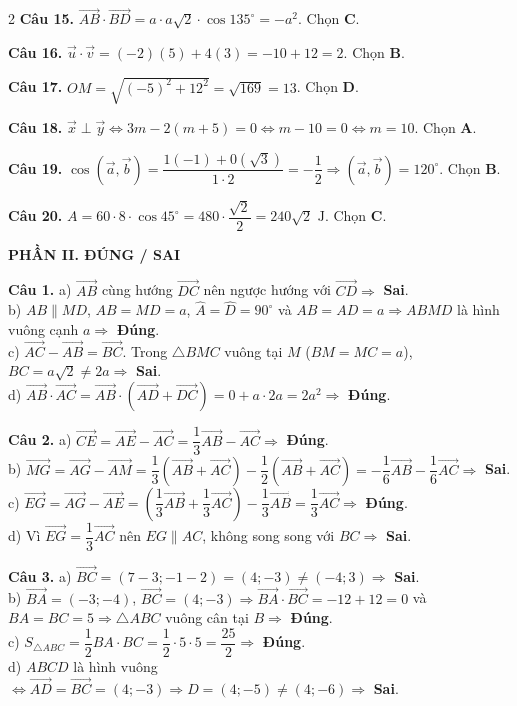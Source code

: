 \documentclass[10pt,a4paper]{article}
\begin{document}
\begin{multicols}{2}
\textbf{Câu 15.} $\vec{AB} \cdot \vec{BD} = a \cdot a\sqrt{2} \cdot \cos 135^\circ = -a^2$. Chọn \textbf{C}.

\textbf{Câu 16.} $\vec{u} \cdot \vec{v} = (-2)(5) + 4(3) = -10 + 12 = 2$. Chọn \textbf{B}.

\textbf{Câu 17.} $OM = \sqrt{(-5)^2 + 12^2} = \sqrt{169} = 13$. Chọn \textbf{D}.

\textbf{Câu 18.} $\vec{x} \perp \vec{y} \Leftrightarrow 3m - 2(m + 5) = 0 \Leftrightarrow m - 10 = 0 \Leftrightarrow m = 10$. Chọn \textbf{A}.

\textbf{Câu 19.} $\cos(\vec{a}, \vec{b}) = \dfrac{1(-1) + 0(\sqrt{3})}{1 \cdot 2} = -\dfrac{1}{2} \Rightarrow (\vec{a}, \vec{b}) = 120^\circ$. Chọn \textbf{B}.

\textbf{Câu 20.} $A = 60 \cdot 8 \cdot \cos 45^\circ = 480 \cdot \dfrac{\sqrt{2}}{2} = 240\sqrt{2}\text{ J}$. Chọn \textbf{C}.

\columnbreak

\textbf{\color{accent}PHẦN II. ĐÚNG / SAI}

\textbf{Câu 1.}
a) $\vec{AB}$ cùng hướng $\vec{DC}$ nên ngược hướng với $\vec{CD} \Rightarrow$ \textbf{Sai}.\\
b) $AB \parallel MD$, $AB = MD = a$, $\widehat{A} = \widehat{D} = 90^\circ$ và $AB = AD = a \Rightarrow ABMD$ là hình vuông cạnh $a \Rightarrow$ \textbf{Đúng}.\\
c) $\vec{AC} - \vec{AB} = \vec{BC}$. Trong $\triangle BMC$ vuông tại $M$ ($BM = MC = a$), $BC = a\sqrt{2} \ne 2a \Rightarrow$ \textbf{Sai}.\\
d) $\vec{AB} \cdot \vec{AC} = \vec{AB} \cdot (\vec{AD} + \vec{DC}) = 0 + a \cdot 2a = 2a^2 \Rightarrow$ \textbf{Đúng}.

\textbf{Câu 2.}
a) $\vec{CE} = \vec{AE} - \vec{AC} = \dfrac{1}{3}\vec{AB} - \vec{AC} \Rightarrow$ \textbf{Đúng}.\\
b) $\vec{MG} = \vec{AG} - \vec{AM} = \dfrac{1}{3}(\vec{AB}+\vec{AC}) - \dfrac{1}{2}(\vec{AB}+\vec{AC}) = -\dfrac{1}{6}\vec{AB} - \dfrac{1}{6}\vec{AC} \Rightarrow$ \textbf{Sai}.\\
c) $\vec{EG} = \vec{AG} - \vec{AE} = \left(\dfrac{1}{3}\vec{AB} + \dfrac{1}{3}\vec{AC}\right) - \dfrac{1}{3}\vec{AB} = \dfrac{1}{3}\vec{AC} \Rightarrow$ \textbf{Đúng}.\\
d) Vì $\vec{EG} = \dfrac{1}{3}\vec{AC}$ nên $EG \parallel AC$, không song song với $BC \Rightarrow$ \textbf{Sai}.

\textbf{Câu 3.}
a) $\vec{BC} = (7 - 3; -1 - 2) = (4; -3) \ne (-4; 3) \Rightarrow$ \textbf{Sai}.\\
b) $\vec{BA} = (-3; -4)$, $\vec{BC} = (4; -3) \Rightarrow \vec{BA}\cdot\vec{BC} = -12 + 12 = 0$ và $BA = BC = 5 \Rightarrow \triangle ABC$ vuông cân tại $B \Rightarrow$ \textbf{Đúng}.\\
c) $S_{\triangle ABC} = \dfrac{1}{2} BA \cdot BC = \dfrac{1}{2} \cdot 5 \cdot 5 = \dfrac{25}{2} \Rightarrow$ \textbf{Đúng}.\\
d) $ABCD$ là hình vuông $\Leftrightarrow \vec{AD} = \vec{BC} = (4; -3) \Rightarrow D = (4; -5) \ne (4; -6) \Rightarrow$ \textbf{Sai}.


\end{multicols}
\end{document}

